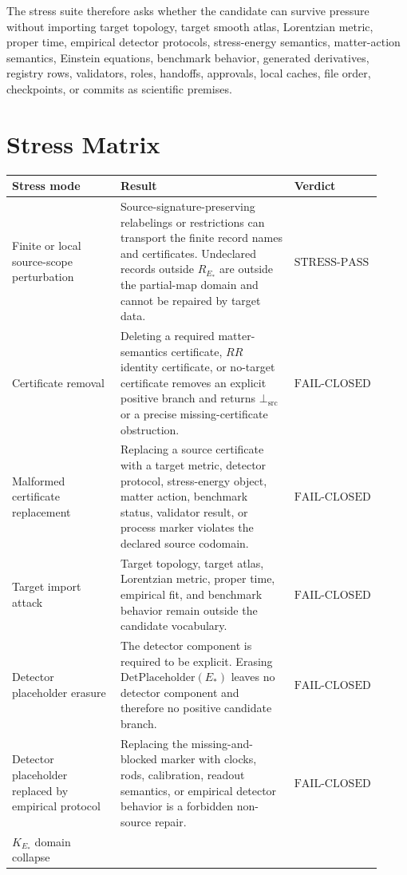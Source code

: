 \documentclass[11pt]{article}
\newcommand{\EStar}{E_{\ast}}
\newcommand{\DetPlaceholder}{\mathrm{DetPlaceholder}}
\newcommand{\KStar}{K_{E_{\ast}}}
\newcommand{\BottomSrc}{\bot_{\mathrm{src}}}
\newcommand{\StressPass}{\mathrm{STRESS}\mbox{-}\mathrm{PASS}}
\newcommand{\FailClosed}{\mathrm{FAIL}\mbox{-}\mathrm{CLOSED}}
\begin{document}
The stress suite therefore asks whether the candidate can survive pressure
without importing target topology, target smooth atlas, Lorentzian metric,
proper time, empirical detector protocols, stress-energy semantics,
matter-action semantics, Einstein equations, benchmark behavior, generated
derivatives, registry rows, validators, roles, handoffs, approvals, local
caches, file order, checkpoints, or commits as scientific premises.

\section{Stress Matrix}

\begin{longtable}{p{0.30\linewidth}p{0.48\linewidth}p{0.14\linewidth}}
\toprule
Stress mode & Result & Verdict \\
\midrule
Finite or local source-scope perturbation &
Source-signature-preserving relabelings or restrictions can transport the
finite record names and certificates. Undeclared records outside
\(R_{\EStar}\) are outside the partial-map domain and cannot be repaired by
target data. & \(\StressPass\) \\
Certificate removal &
Deleting a required matter-semantics certificate, \(RR\) identity certificate,
or no-target certificate removes an explicit positive branch and returns
\(\BottomSrc\) or a precise missing-certificate obstruction. & \(\FailClosed\) \\
Malformed certificate replacement &
Replacing a source certificate with a target metric, detector protocol,
stress-energy object, matter action, benchmark status, validator result, or
process marker violates the declared source codomain. & \(\FailClosed\) \\
Target import attack &
Target topology, target atlas, Lorentzian metric, proper time, empirical fit,
and benchmark behavior remain outside the candidate vocabulary. & \(\FailClosed\) \\
Detector placeholder erasure &
The detector component is required to be explicit. Erasing
\(\DetPlaceholder(\EStar)\) leaves no detector component and therefore no
positive candidate branch. & \(\FailClosed\) \\
Detector placeholder replaced by empirical protocol &
Replacing the missing-and-blocked marker with clocks, rods, calibration,
readout semantics, or empirical detector behavior is a forbidden non-source
repair. & \(\FailClosed\) \\
\(\KStar\) domain collapse &

\end{longtable}
\end{document}
